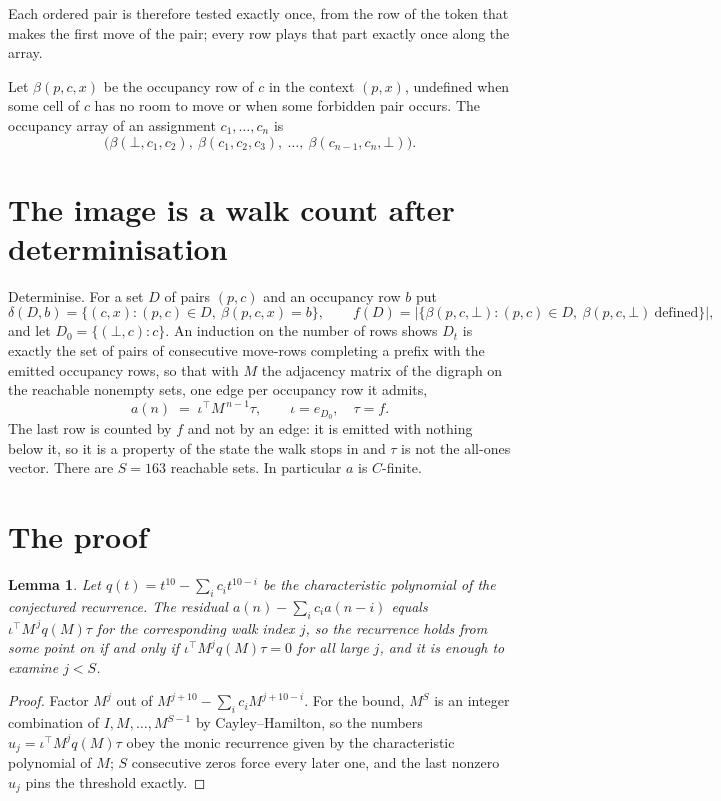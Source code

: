 \documentclass[11pt,a4paper]{article}
\theoremstyle{plain}
\newtheorem{lemma}[theorem]{Lemma}
\theoremstyle{definition}
\begin{document}
Each ordered pair is therefore tested exactly once, from the row of the token that makes the
first move of the pair; every row plays that part exactly once along the array.

Let $\beta(p,c,x)$ be the occupancy row of $c$ in the context $(p,x)$, undefined when some
cell of $c$ has no room to move or when some forbidden pair occurs. The occupancy array of an
assignment $c_1,\dots,c_n$ is
\[
\bigl(\beta(\bot,c_1,c_2),\ \beta(c_1,c_2,c_3),\ \dots,\ \beta(c_{n-1},c_n,\bot)\bigr).
\]

\section{The image is a walk count after determinisation}

Determinise. For a set $D$ of pairs $(p,c)$ and an occupancy row $b$ put
\[
\delta(D,b)=\{(c,x):(p,c)\in D,\ \beta(p,c,x)=b\},\qquad
f(D)=\bigl|\{\beta(p,c,\bot):(p,c)\in D,\ \beta(p,c,\bot)\ \text{defined}\}\bigr| ,
\]
and let $D_0=\{(\bot,c):c\}$. An induction on the number of rows shows $D_t$ is exactly the
set of pairs of consecutive move-rows completing a prefix with the emitted occupancy rows, so
that with $M$ the adjacency matrix of the digraph on the reachable nonempty sets, one edge per
occupancy row it admits,
\[
a(n)\;=\;\iota^{\!\top}M^{\,n-1}\tau,\qquad \iota=e_{D_0},\quad \tau=f .
\]
The last row is counted by $f$ and not by an edge: it is emitted with nothing below it, so it
is a property of the state the walk stops in and $\tau$ is not the all-ones vector. There are
$S=163$ reachable sets. In particular $a$ is $C$-finite.

\section{The proof}

\begin{lemma}\label{lem:crit}
Let $q(t)=t^{10}-\sum_i c_it^{10-i}$ be the characteristic polynomial of the
conjectured recurrence. The residual $a(n)-\sum_ic_ia(n-i)$ equals
$\iota^{\!\top}M^{\,j}q(M)\tau$ for the corresponding walk index $j$, so the recurrence
holds from some point on if and only if $\iota^{\!\top}M^{j}q(M)\tau=0$ for all large $j$,
and it is enough to examine $j<S$.
\end{lemma}

\begin{proof}
Factor $M^{j}$ out of $M^{j+10}-\sum_ic_iM^{j+10-i}$. For the bound, $M^{S}$
is an integer combination of $I,M,\dots,M^{S-1}$ by Cayley--Hamilton, so the numbers
$u_j=\iota^{\!\top}M^{j}q(M)\tau$ obey the monic recurrence given by the characteristic
polynomial of $M$; $S$ consecutive zeros force every later one, and the last nonzero $u_j$
pins the threshold exactly.
\end{proof}
\end{document}
